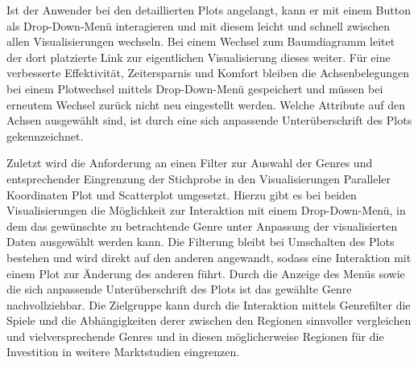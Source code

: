 \documentclass[usegeometry=true]{scrartcl}
\begin{document}
Ist der Anwender bei den detaillierten Plots angelangt, kann er mit einem Button als Drop-Down-Menü interagieren 
und mit diesem leicht und schnell zwischen allen Visualisierungen wechseln.
Bei einem Wechsel zum Baumdiagramm leitet der dort platzierte Link zur eigentlichen Visualisierung dieses weiter. 
Für eine verbesserte Effektivität, Zeitersparnis und Komfort bleiben die Achsenbelegungen bei einem Plotwechsel mittels Drop-Down-Menü gespeichert 
und müssen bei erneutem Wechsel zurück nicht neu eingestellt werden. 
Welche Attribute auf den Achsen ausgewählt sind, ist durch eine sich anpassende Unterüberschrift des Plots gekennzeichnet. 

Zuletzt wird die Anforderung an einen Filter zur Auswahl der Genres und entsprechender Eingrenzung der Stichprobe in den Visualisierungen Paralleler Koordinaten Plot und Scatterplot umgesetzt.
Hierzu gibt es bei beiden Visualisierungen die Möglichkeit zur Interaktion mit einem Drop-Down-Menü, 
in dem das gewünschte zu betrachtende Genre unter Anpassung der visualisierten Daten ausgewählt werden kann.
Die Filterung bleibt bei Umschalten des Plots bestehen und wird direkt auf den anderen angewandt, 
sodass eine Interaktion mit einem Plot zur Änderung des anderen führt. 
Durch die Anzeige des Menüs sowie die sich anpassende Unterüberschrift des Plots ist das gewählte Genre nachvollziehbar.
Die Zielgruppe kann durch die Interaktion mittels Genrefilter die Spiele und die Abhängigkeiten derer zwischen den Regionen sinnvoller vergleichen 
und vielversprechende Genres und in diesen möglicherweise Regionen für die Investition in weitere Marktstudien eingrenzen.

\end{document}
